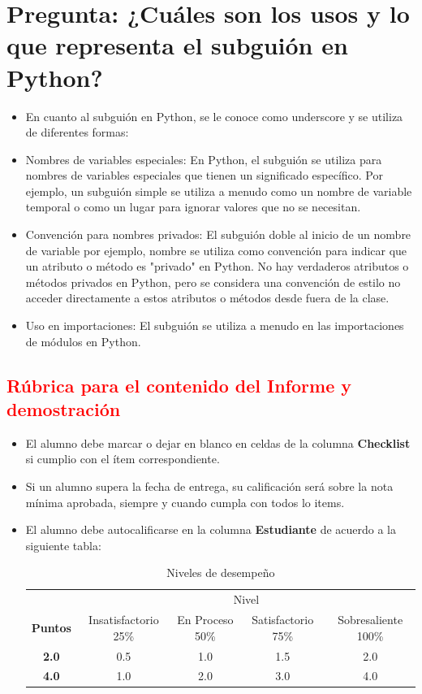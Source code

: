 \documentclass{article}
\begin{document}
	\section{Pregunta: ¿Cuáles son los usos y lo que representa el subguión en Python?}
	\begin{itemize}
		\item En cuanto al subguión en Python, se le conoce como underscore y se utiliza de diferentes formas:
		\item Nombres de variables especiales: En Python, el subguión se utiliza para nombres de variables especiales que tienen un significado específico. Por ejemplo, un subguión simple se utiliza a menudo como un nombre de variable temporal o como un lugar para ignorar valores que no se necesitan.
		\item Convención para nombres privados: El subguión doble al inicio de un nombre de variable por ejemplo, nombre se utiliza como convención para indicar que un atributo o método es "privado" en Python. No hay verdaderos atributos o métodos privados en Python, pero se considera una convención de estilo no acceder directamente a estos atributos o métodos desde fuera de la clase.
		\item Uso en importaciones: El subguión se utiliza a menudo en las importaciones de módulos en Python.
	\end{itemize}	
\subsection{\textcolor{red}{Rúbrica para el contenido del Informe y demostración}}
\begin{itemize}			
	\item El alumno debe marcar o dejar en blanco en celdas de la columna \textbf{Checklist} si cumplio con el ítem correspondiente.
	\item Si un alumno supera la fecha de entrega,  su calificación será sobre la nota mínima aprobada, siempre y cuando cumpla con todos lo items.
	\item El alumno debe autocalificarse en la columna \textbf{Estudiante} de acuerdo a la siguiente tabla:

	\begin{table}[ht]
		\caption{Niveles de desempeño}
		\begin{center}
		\begin{tabular}{ccccc}
			\hline
			 & \multicolumn{4}{c}{Nivel}\\
			\cline{1-5}
			\textbf{Puntos} & Insatisfactorio 25\%& En Proceso 50\% & Satisfactorio 75\% & Sobresaliente 100\%\\
			\textbf{2.0}&0.5&1.0&1.5&2.0\\
			\textbf{4.0}&1.0&2.0&3.0&4.0\\
		\hline
		\end{tabular}
	\end{center}
\end{table}	

\end{itemize}
\end{document}
